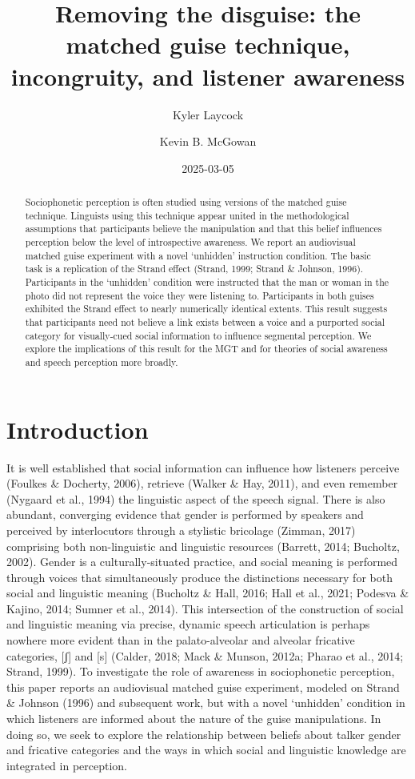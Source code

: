 \documentclass[
  letterpaper,
  DIV=11,
  numbers=noendperiod]{scrartcl}
\title{Removing the disguise: the matched guise technique, incongruity,
and listener awareness}
\author{Kyler Laycock \and Kevin B. McGowan}
\date{2025-03-05}
\begin{document}
\maketitle
\begin{abstract}
Sociophonetic perception is often studied using versions of the matched
guise technique. Linguists using this technique appear united in the
methodological assumptions that participants believe the manipulation
and that this belief influences perception below the level of
introspective awareness. We report an audiovisual matched guise
experiment with a novel `unhidden' instruction condition. The basic task
is a replication of the Strand effect (Strand, 1999; Strand \& Johnson,
1996). Participants in the `unhidden' condition were instructed that the
man or woman in the photo did not represent the voice they were
listening to. Participants in both guises exhibited the Strand effect to
nearly numerically identical extents. This result suggests that
participants need not believe a link exists between a voice and a
purported social category for visually-cued social information to
influence segmental perception. We explore the implications of this
result for the MGT and for theories of social awareness and speech
perception more broadly.
\end{abstract}


\section{Introduction}\label{sec-intro}

It is well established that social information can influence how
listeners perceive (Foulkes \& Docherty, 2006), retrieve (Walker \& Hay,
2011), and even remember (Nygaard et al., 1994) the linguistic aspect of
the speech signal. There is also abundant, converging evidence that
gender is performed by speakers and perceived by interlocutors through a
stylistic bricolage (Zimman, 2017) comprising both non-linguistic and
linguistic resources (Barrett, 2014; Bucholtz, 2002). Gender is a
culturally-situated practice, and social meaning is performed through
voices that simultaneously produce the distinctions necessary for both
social and linguistic meaning (Bucholtz \& Hall, 2016; Hall et al.,
2021; Podesva \& Kajino, 2014; Sumner et al., 2014). This intersection
of the construction of social and linguistic meaning via precise,
dynamic speech articulation is perhaps nowhere more evident than in the
palato-alveolar and alveolar fricative categories, {[}ʃ{]} and {[}s{]}
(Calder, 2018; Mack \& Munson, 2012a; Pharao et al., 2014; Strand,
1999). To investigate the role of awareness in sociophonetic perception,
this paper reports an audiovisual matched guise experiment, modeled on
Strand \& Johnson (1996) and subsequent work, but with a novel
`unhidden' condition in which listeners are informed about the nature of
the guise manipulations. In doing so, we seek to explore the
relationship between beliefs about talker gender and fricative
categories and the ways in which social and linguistic knowledge are
integrated in perception.
\end{document}
